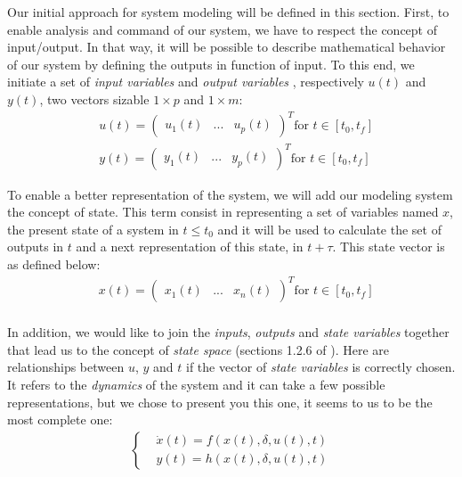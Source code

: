 Our initial approach for system modeling will be defined in this section. First, to enable analysis and command of our system, we have to respect the concept of input/output. In that way, it will be possible to describe mathematical behavior of our system by defining the outputs in function of input. To this end, we initiate a set of \emph{input variables} and \emph{output variables} \cite{cassandras2009introduction}, respectively $u(t)$ and $y(t)$, two vectors sizable $1\times p$ and $1\times m$:
\begin{align*}
&u(t) = \begin{pmatrix}
u_1(t)&...&u_p(t)
\end{pmatrix}^T \text{for }t \in [t_0, t_f]\\
&y(t) = \begin{pmatrix}
y_1(t)&...&y_p(t)
\end{pmatrix}^T \text{for }t \in [t_0, t_f]
\end{align*}

To enable a better representation of the system, we will add our modeling system the concept of state. This term consist in representing a set of variables named $x$, the present state of a system in $t\leq t_0$ and it will be used to calculate the set of outputs in $t$ and a next representation of this state, in $t + \tau$. This state vector is as defined below: 
\begin{align*}
&x(t) = \begin{pmatrix}
x_1(t)&...&x_n(t)
\end{pmatrix}^T \text{for }t \in [t_0, t_f]\\
\end{align*}

In addition, we would like to join the \emph{inputs}, \emph{outputs} and \emph{state variables} together that lead us to the concept of \emph{state space} (sections 1.2.6 of \cite{cassandras2009introduction}). Here are relationships between $u$, $y$ and $t$ if the vector of \emph{state variables} is correctly chosen. It refers to the \emph{dynamics} of the system and it can take a few possible representations, but we chose to present you this one, it seems to us to be the most complete one:
\begin{eqnarray} \label{equationSystem_1}
\left\lbrace
\begin{aligned}
&\dot{x}(t)= f(x(t), \delta, u(t), t)\\ %
&y(t) = h(x(t), \delta, u(t), t) 
\end{aligned} 
\right.
\end{eqnarray}


